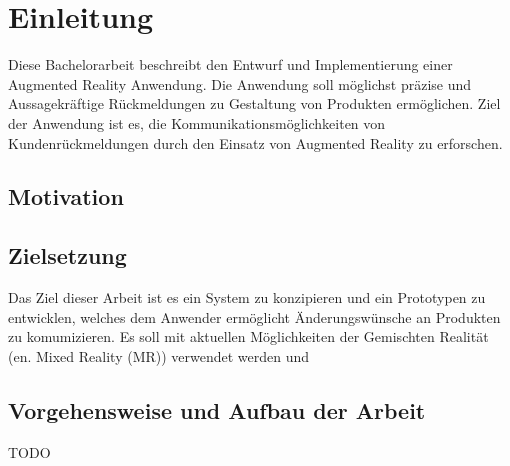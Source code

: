 \chapter{Einleitung}

Diese Bachelorarbeit beschreibt den Entwurf und Implementierung einer Augmented Reality Anwendung. Die Anwendung soll  möglichst präzise und Aussagekräftige Rückmeldungen zu Gestaltung von Produkten ermöglichen.  Ziel der Anwendung  ist es, die Kommunikationsmöglichkeiten von Kundenrückmeldungen durch den Einsatz von Augmented Reality zu erforschen.

\section{Motivation}


\section{Zielsetzung}

Das Ziel dieser Arbeit ist es ein System zu konzipieren und ein Prototypen zu entwicklen, welches dem Anwender ermöglicht Änderungswünsche an Produkten 
zu komumizieren. Es soll mit aktuellen Möglichkeiten der Gemischten Realität (en. Mixed Reality (MR)) verwendet werden und 



\section{Vorgehensweise und Aufbau der Arbeit}
TODO

